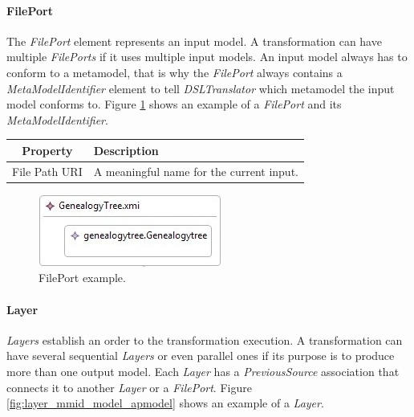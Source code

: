 \paragraph{FilePort}

The \emph{FilePort} element represents an input model. A
transformation can have multiple \emph{FilePorts} if it uses multiple input
models. An input model always has to conform to a metamodel, that is why the
\emph{FilePort} always contains a \emph{MetaModelIdentifier} element to tell
\emph{DSLTranslator} which metamodel the input model conforms to. Figure
\ref{fig:FilePort} shows an example of a \emph{FilePort} and its
\emph{MetaModelIdentifier}. 

\begin{center}
  \begin{tabular}{ | c | p{\paragraphsize} | }
    \hline
    \textbf{Property} & \textbf{Description} \\ \hline
    File Path URI & A meaningful name for the current input.   \\ \hline
  \end{tabular}
\end{center}

\begin{figure}[h]
\begin{center}
  \includegraphics[scale=0.7]{imgs/FilePort.jpg}
  \caption{FilePort example.}
  \label{fig:FilePort}
\end{center}
\end{figure}


\paragraph{Layer}

\emph{Layers} establish an order to the transformation execution. A
transformation can have several sequential \emph{Layers} or even parallel ones if
its purpose is to produce more than one output model. Each \emph{Layer} has a
\emph{PreviousSource} association that connects it to another \emph{Layer} or a
\emph{FilePort}. Figure \ref{fig:layer_mmid_model_apmodel} shows an example of a
\emph{Layer}.

